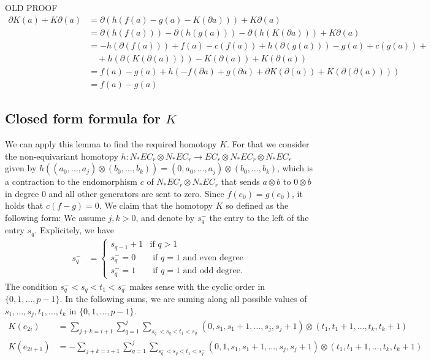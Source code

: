 \noindent OLD PROOF
\begin{align*}
	\partial K(a) + K\partial(a)
	&= \partial(h(f(a)-g(a)-K(\partial a))) + K\partial(a) \\
	&= \partial(h(f(a)))-\partial(h(g(a)))-\partial(h(K(\partial a))) + K\partial(a) \\
	&= -h(\partial(f(a))) + f(a) -c(f(a))+ h(\partial(g(a))) - g(a)+c(g(a))  + \\
	&\quad + h(\partial(K(\partial(a)))) - K(\partial(a)) + K(\partial(a)) \\
	&= f(a) - g(a) + h\left(-f(\partial a) + g(\partial a) + \partial K(\partial(a)) + K(\partial(\partial(a)))\right) \\
	&= f(a) - g(a)
\end{align*}

\subsection{Closed form formula for $K$}

We can apply this lemma to find the required homotopy $K$. For that we consider the non-equivariant homotopy $h\colon N_*EC_r\otimes N_*EC_r\to EC_r\otimes N_*EC_r\otimes N_*EC_r$ given by $h((a_0,\ldots,a_j)\otimes(b_0,\ldots,b_k)) = (0,a_0,\ldots,a_j)\otimes(b_0,\ldots,b_k)$, which is a contraction to the endomorphism $c$ of $N_*EC_r\otimes N_*EC_r$ that sends $a\otimes b$ to $0\otimes b$ in degree $0$ and all other generators are sent to zero. Since $f(e_0) = g(e_0)$, it holds that $c(f-g) = 0$. We claim that the homotopy $K$ so defined as the following form: We assume $j,k>0$, and denote by $s_q^-$ the entry to the left of the entry $s_q$. Explicitely, we have
\begin{align*}
	s_q^- &= \begin{cases}s_{q-1}+1 & \text{if $q>1$}\\
		s_q^- = 0 & \text{ if $q=1$ and even degree} \\
		s_q^- = 1 &\text{ if $q=1$ and odd degree.}
	\end{cases}
\end{align*}
The condition $s_q^-<s_q<t_1<s_q^-$ makes sense with the cyclic order in $\{0,1,\ldots,p-1\}$. In the following sums, we are suming along all possible values of $s_1,\ldots,s_j,t_1,\ldots,t_k$ in $\{0,1,\ldots,p-1\}$.
\begin{align*}
	K(e_{2i}) &= \sum_{j+k = i+1}{\sum_{q=1}^j{\sum_{s_q^-<s_q<t_1<s_q^-}{(0,s_1,s_1+1,\ldots,s_j,s_j+1)\otimes(t_1,t_1+1,\ldots,t_k,t_k+1)}}} \\
	K(e_{2i+1}) &= -\sum_{j+k = i+1}{\sum_{q=1}^j{\sum_{s_q^-<s_q<t_1<s_q^-}{(0,1,s_1,s_1+1,\ldots,s_j,s_j+1)\otimes(t_1,t_1+1,\ldots,t_k,t_k+1)}}}
\end{align*}

